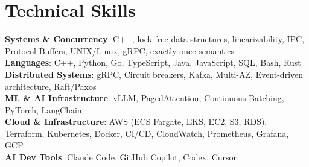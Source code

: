\documentclass[letterpaper,11pt]{article}
\begin{document}
\section{Technical Skills}
\vspace{-7pt}
\begin{itemize}
[leftmargin=0.15in, label={}]\small{\item{
        \textbf{Systems \& Concurrency}{: C++, lock-free data structures, linearizability, IPC, Protocol Buffers, UNIX/Linux, gRPC, exactly-once semantics} \\
        \textbf{Languages}{: C++, Python, Go, TypeScript, Java, JavaScript, SQL, Bash, Rust} \\
        \textbf{Distributed Systems}{: gRPC, Circuit breakers, Kafka, Multi-AZ, Event-driven architecture, Raft/Paxos} \\
        \textbf{ML \& AI Infrastructure}{: vLLM, PagedAttention, Continuous Batching, PyTorch, LangChain} \\
        \textbf{Cloud \& Infrastructure}{: AWS (ECS Fargate, EKS, EC2, S3, RDS), Terraform, Kubernetes, Docker, CI/CD, CloudWatch, Prometheus, Grafana, GCP} \\
        \textbf{AI Dev Tools}{: Claude Code, GitHub Copilot, Codex, Cursor} \\
}}
\end{itemize}
\end{document}
